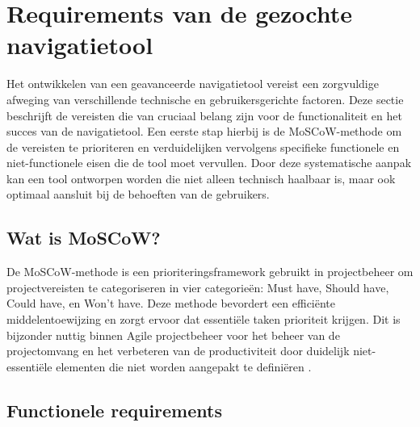 \section{Requirements van de gezochte navigatietool}
\label{sec:requirements van de gezochte navigatietool}

Het ontwikkelen van een geavanceerde navigatietool vereist een zorgvuldige afweging van verschillende technische en gebruikersgerichte factoren. Deze sectie beschrijft de vereisten die van cruciaal belang zijn voor de functionaliteit en het succes van de navigatietool. Een eerste stap hierbij is de MoSCoW-methode om de vereisten te prioriteren en verduidelijken vervolgens specifieke functionele en niet-functionele eisen die de tool moet vervullen. Door deze systematische aanpak kan een tool ontworpen worden die niet alleen technisch haalbaar is, maar ook optimaal aansluit bij de behoeften van de gebruikers.

\subsection{Wat is MoSCoW?}

De MoSCoW-methode is een prioriteringsframework gebruikt in projectbeheer om projectvereisten te categoriseren in vier categorieën: Must have, Should have, Could have, en Won't have. Deze methode bevordert een efficiënte middelentoewijzing en zorgt ervoor dat essentiële taken prioriteit krijgen. Dit is bijzonder nuttig binnen Agile projectbeheer voor het beheer van de projectomvang en het verbeteren van de productiviteit door duidelijk niet-essentiële elementen die niet worden aangepakt te definiëren \autocite{Brush2023}.

\subsection{Functionele requirements}
\label{sec:functionele requirements}


